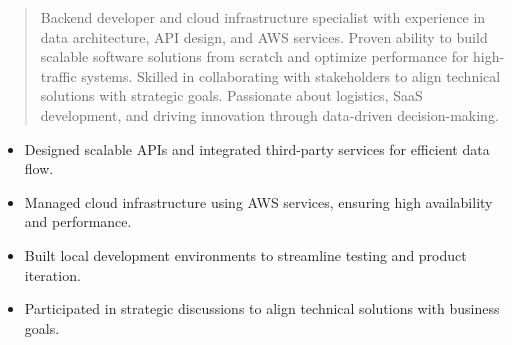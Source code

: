 



\makecvheader

\begin{quote}
  \noindent
  Backend developer and cloud infrastructure specialist with experience in data architecture, API design, and AWS services. Proven ability to build scalable software solutions from scratch and optimize performance for high-traffic systems. Skilled in collaborating with stakeholders to align technical solutions with strategic goals. Passionate about logistics, SaaS development, and driving innovation through data-driven decision-making.
\end{quote}

\par\smallskip
\noindent
\begin{minipage}{20cm}
  \begin{minipage}{9.75cm}
    \begin{itemize}
      \item Designed scalable APIs and integrated third-party services for efficient data flow.
      \item Managed cloud infrastructure using AWS services, ensuring high availability and performance.
    \end{itemize}
  \end{minipage}
  \hfill
  \begin{minipage}{9.75cm}
    \begin{itemize}
      \item Built local development environments to streamline testing and product iteration.
      \item Participated in strategic discussions to align technical solutions with business goals.
    \end{itemize}
  \end{minipage}
\end{minipage}
\par\smallskip
\divider

